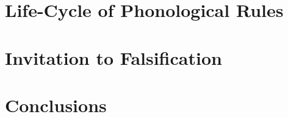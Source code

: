 
\section{Life-Cycle of Phonological Rules}
\label{trad}




\section{}
\label{newzea}

\section{}
\label{philly}

\section{Invitation to Falsification}
\label{test}


\section{Conclusions}








%
%


